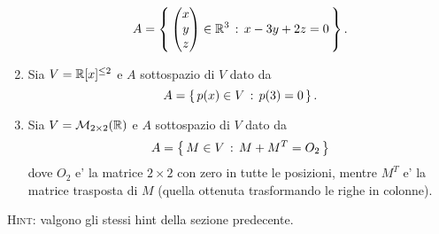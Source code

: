 \begin{exercise}
\begin{enumerate}
\[            A = \left\{\,\begin{pmatrix}
                x \\ y \\ z
            \end{pmatrix} \in \mathbb{R}^3 \,:\, x - 3y + 2z = 0\,\right\}.
        \]
        \item Sia $V = \mathbb{R}[x]^{\leq 2}$ e $A$ sottospazio di $V$ dato da \[
            A = \left\{\,p(x) \in V \,:\, p(3) = 0\,\right\}.
        \]
        \item Sia $V = \mathcal{M}_{2 \times 2}(\mathbb{R})$ e $A$ sottospazio di $V$ dato da \[
            A = \left\{\,M \in V \,:\, M + M^T = O_2\,\right\}
        \] dove $O_2$ e' la matrice $2 \times 2$ con zero in tutte le posizioni, mentre $M^T$ e' la matrice trasposta di $M$ (quella ottenuta trasformando le righe in colonne).
    \end{enumerate}
\end{exercise}

\textsc{Hint:} valgono gli stessi hint della sezione predecente.
